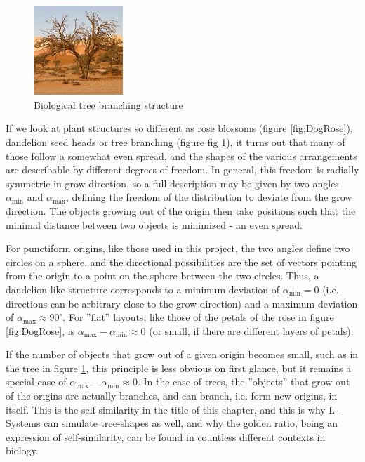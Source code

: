 \documentclass[11pt]{scrartcl}
\begin{document}
\begin{figure} 
 	\centering
 		\includegraphics[width=0.3\textwidth]{Pic_Tree.png}
 	\caption{Biological tree branching structure  \cite{WikipediaTree}}
 	\label{fig:IRLTree}
\end{figure}

If we look at plant structures so different as rose blossoms (figure \ref{fig:DogRose}), dandelion seed heads or tree branching (figure fig \ref{fig:IRLTree}), it turns out that many of those follow a somewhat even spread, and the shapes of the various arrangements are describable by different degrees of freedom. In general, this freedom is radially symmetric in grow direction, so a full description may be given by two angles $\alpha_\text{min}$ and $\alpha_\text{max}$, defining the freedom of the distribution to deviate from the grow direction. The objects growing out of the origin then take positions such that the minimal distance between two objects is minimized - an even spread.

For punctiform origins, like those used in this project, the two angles define two circles on a sphere, and the directional possibilities are the set of vectors pointing from the origin to a point on the sphere between the two circles. Thus, a dandelion-like structure corresponds to a minimum deviation of $\alpha_\text{min} = 0$ (i.e. directions can be arbitrary close to the grow direction) and a maximum deviation of 
$\alpha_\text{max} \approx 90^\circ$. For ''flat'' layouts, like those of the petals of the rose in figure \ref{fig:DogRose}, is $\alpha_\text{max} - \alpha_\text{min} \approx 0$ (or small, if there are different layers of petals).

If the number of objects that grow out of a given origin becomes small, such as in the tree in figure \ref{fig:IRLTree}, this principle is less obvious on first glance, but it remains a special case of $\alpha_\text{max} - \alpha_\text{min} \approx 0$. In the case of trees, the ''objects'' that grow out of the origins are actually branches, and can branch, i.e. form new origins, in itself. This is the self-similarity in the title of this chapter, and this is why L-Systems can simulate tree-shapes as well, and why the golden ratio, being an expression of self-similarity, can be found in countless different contexts in biology.
\end{document}
